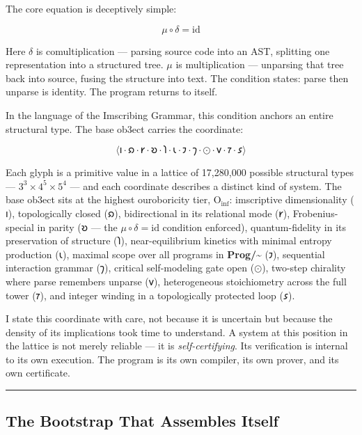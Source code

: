 \documentclass[12pt,a4paper]{article}
\begin{document}
The core equation is deceptively simple:

\[\mu \circ \delta = \mathrm{id}\]

Here $\delta$ is comultiplication --- parsing source code into an AST, splitting one representation into a structured tree. $\mu$ is multiplication --- unparsing that tree back into source, fusing the structure into text. The condition states: parse then unparse is identity. The program returns to itself.

In the language of the Imscribing Grammar, this condition anchors an entire structural type. The base ob3ect carries the coordinate:

\[\langle \text{𐑦} \cdot \text{𐑸} \cdot \text{𐑾} \cdot \text{𐑹} \cdot \text{𐑐} \cdot \text{𐑧} \cdot \text{𐑲} \cdot \text{𐑠} \cdot \odot \cdot \text{𐑫} \cdot \text{𐑳} \cdot \text{𐑭} \rangle\]

Each glyph is a primitive value in a lattice of 17,280,000 possible structural types --- $3^3 \times 4^5 \times 5^4$ --- and each coordinate describes a distinct kind of system. The base ob3ect sits at the highest ouroboricity tier, $\text{O}_{\text{inf}}$: imscriptive dimensionality ($\text{𐑦}$), topologically closed ($\text{𐑸}$), bidirectional in its relational mode ($\text{𐑾}$), Frobenius-special in parity ($\text{𐑹}$ --- the $\mu\circ\delta = \mathrm{id}$ condition enforced), quantum-fidelity in its preservation of structure ($\text{𐑐}$), near-equilibrium kinetics with minimal entropy production ($\text{𐑧}$), maximal scope over all programs in \textbf{Prog/\textasciitilde{}} ($\text{𐑲}$), sequential interaction grammar ($\text{𐑠}$), critical self-modeling gate open ($\odot$), two-step chirality where parse remembers unparse ($\text{𐑫}$), heterogeneous stoichiometry across the full tower ($\text{𐑳}$), and integer winding in a topologically protected loop ($\text{𐑭}$).

I state this coordinate with care, not because it is uncertain but because the density of its implications took time to understand. A system at this position in the lattice is not merely reliable --- it is \emph{self-certifying}. Its verification is internal to its own execution. The program is its own compiler, its own prover, and its own certificate.

\begin{center}
\rule{0.5\textwidth}{0.4pt}
\end{center}

\subsection{The Bootstrap That Assembles Itself}
\end{document}

